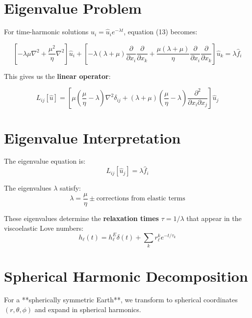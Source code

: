 \documentclass{article}
\begin{document}
\section{Eigenvalue Problem}

For time-harmonic solutions $u_i = \hat{u}_i e^{-\lambda t}$, equation (13) becomes:

\begin{equation}
\left[-\lambda\mu\nabla^2 + \frac{\mu^2}{\eta}\nabla^2\right]\hat{u}_i + \left[-\lambda(\lambda + \mu)\frac{\partial}{\partial x_i}\frac{\partial}{\partial x_k} + \frac{\mu(\lambda + \mu)}{\eta}\frac{\partial}{\partial x_i}\frac{\partial}{\partial x_k}\right]\hat{u}_k = \lambda\hat{f}_i
\end{equation}

This gives us the \textbf{linear operator}:

\begin{equation}
\boxed{
L_{ij}[\hat{u}] = \left[\mu\left(\frac{\mu}{\eta} - \lambda\right)\nabla^2\delta_{ij} + (\lambda + \mu)\left(\frac{\mu}{\eta} - \lambda\right)\frac{\partial^2}{\partial x_i \partial x_j}\right]\hat{u}_j
}
\end{equation}

\section{Eigenvalue Interpretation}

The eigenvalue equation is:
\begin{equation}
L_{ij}[\hat{u}_j] = \lambda\hat{f}_i
\end{equation}

The eigenvalues $\lambda$ satisfy:
\begin{equation}
\lambda = \frac{\mu}{\eta} \pm \text{corrections from elastic terms}
\end{equation}

These eigenvalues determine the \textbf{relaxation times} $\tau = 1/\lambda$ that appear in the viscoelastic Love numbers:
\begin{equation}
h_\ell(t) = h_\ell^E\delta(t) + \sum_k r_\ell^k e^{-t/\tau_k}
\end{equation}

\section{Spherical Harmonic Decomposition}

For a **spherically symmetric Earth**, we transform to spherical coordinates $(r,\theta,\phi)$ and expand in spherical harmonics.
\end{document}
